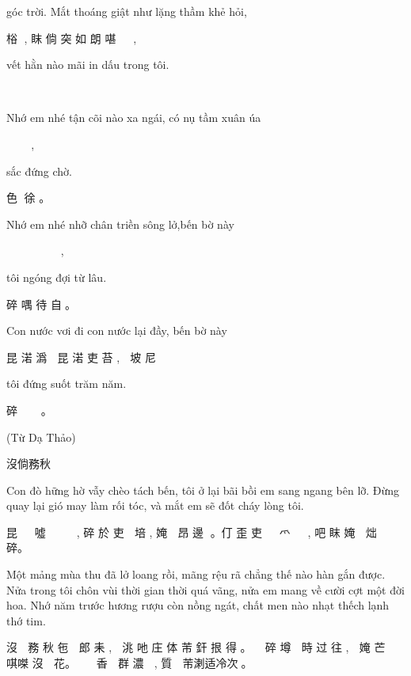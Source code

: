 \documentclass[14pt,a4paper]{extarticle}
\begin{document}
{\small  góc trời. Mắt thoáng giật như lặng thầm khẻ hỏi, }
 
 㭲    𡗶,    眜    倘    突    如    朗    啿    𡃊    𠳨    ,   
 
{\small vết hằn nào mãi in dấu trong tôi.} 

 𤵖    垠    芾     買  印  𨁪    𥪝    碎。



{\small Nhớ em nhé tận cõi nào xa ngái, \hfill có nụ tầm xuân úa}

𢖵㛪𠰚盡𡎝芾車𥇹, 固𦵚荨春𦼇

 {\small sắc đứng chờ.}
 
 色𥪸 徐    。

{\small Nhớ em nhé nhỡ chân triền sông lở,\hfill  bến bờ này}



𢖵    㛪    𠰚    𨀾    蹎    廛    滝    𡋿    ,    𡍣    坡    尼   


{\small  tôi ngóng đợi từ lâu.}
 
  碎    喁    待 自𥹰。


{\small Con nước vơi đi con nước lại đầy, bến bờ này} 

 昆 渃 潙 𠫾 昆 渃 吏 苔 , 𡍣 坡 尼 
 
{\small tôi đứng suốt trăm năm.}

 碎 𥪸 𢖀 𤾓𢆥。



{\small (Từ Dạ Thảo)}


\newpage 

\Large 沒倘務秋\bigskip 

{\small \baselineskip=10pt  Con đò hững hờ vẫy chèo tách bến, tôi ở lại bãi bồi em sang ngang bên lỡ. Đừng quay lại gió may làm rối tóc, và mắt em sẽ đốt cháy lòng tôi.\par }

昆 𦪂 𠾿 噓 𢭶 𣛨 𠝖 𡍣 , 碎 於 吏 𡓁 培 , 㛪 𨖅
 昂   邊 𡋿。仃 歪 吏 𩙋 𩘄 爫 𩯀 𦆹 , 吧 眜 㛪 𠱊
炪 𤈜 𢚸 碎。\bigskip 

{\small \baselineskip=10pt Một mảng mùa thu đã lở loang rồi, mãng rệu rã chẳng thế nào hàn gắn được. Nửa trong tôi chôn vùi thời gian thời quá vãng, nửa em mang về cười cợt một đời hoa.   Nhớ năm trước hương rượu còn nồng ngát, chất men nào nhạt thếch lạnh thớ tim. \par}\medskip 

 沒 𥮎 務 秋 㐌 𡋿 郎 耒 , 𥮎 洮 吔 庄 体 芾 釬
 拫  得 。𡛤  𥪝   碎   墫  𣼯  時  过  往  ,  𡛤  㛪  芒  𧗱
唭𠹳  沒  𠁀  花。𢖵  𢆥  𠓀  香  𤄍  群  濃  𠯪  ,  質  𥽔
芾溂适冷次𦙦。\bigskip 
\end{document}
